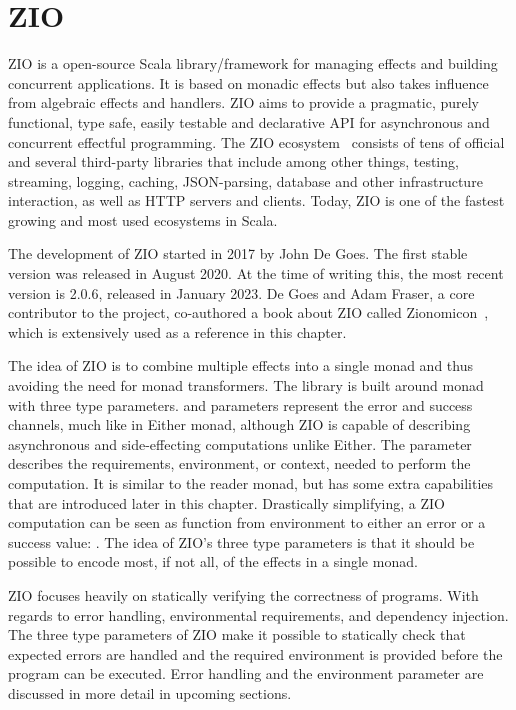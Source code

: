 \chapter{ZIO} \label{zio}
ZIO is a open-source Scala library/framework for managing effects and building concurrent applications. It is based on monadic effects but also takes influence from algebraic effects and handlers. ZIO aims to provide a pragmatic, purely functional, type safe, easily testable and declarative API for asynchronous and concurrent effectful programming. The ZIO ecosystem~\cite{zio} consists of tens of official and several third-party libraries that include among other things, testing, streaming, logging, caching, JSON-parsing, database and other infrastructure interaction, as well as HTTP servers and clients. Today, ZIO is one of the fastest growing and most used ecosystems in Scala.

The development of ZIO started in 2017 by John De Goes. The first stable version was released in August 2020. At the time of writing this, the most recent version is 2.0.6, released in January 2023. De Goes and Adam Fraser, a core contributor to the project, co-authored a book about ZIO called Zionomicon~\cite{zionomicon}, which is extensively used as a reference in this chapter.

The idea of ZIO is to combine multiple effects into a single monad and thus avoiding the need for monad transformers. The library is built around  monad with three type parameters.  and  parameters represent the error and success channels, much like in Either monad, although ZIO is capable of describing asynchronous and side-effecting computations unlike Either. The  parameter describes the requirements, environment, or context, needed to perform the computation. It is similar to the reader monad, but has some extra capabilities that are introduced later in this chapter. Drastically simplifying, a ZIO computation can be seen as function from environment to either an error or a success value: . The idea of ZIO's three type parameters is that it should be possible to encode most, if not all, of the effects in a single monad. 

ZIO focuses heavily on statically verifying the correctness of programs. With regards to error handling, environmental requirements, and dependency injection. The three type parameters of ZIO make it possible to statically check that expected errors are handled and the required environment is provided before the program can be executed. Error handling and the environment parameter are discussed in more detail in upcoming sections.

